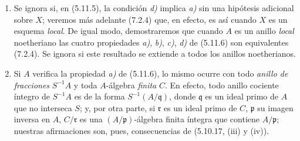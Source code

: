 \begin{remarks}[5.11.7]
\label{IV.2.s5.11.7-fr}
\begin{enumerate}
\item[(i)] Se ignora si, en (5.11.5), la condición \emph{d)} implica \emph{a)} sin una
hipótesis adicional sobre $X$; veremos más adelante (7.2.4) que, en efecto, es
así cuando $X$ es un esquema \emph{local}. De igual modo, demostraremos que
cuando $A$ es un anillo \emph{local} noetheriano las cuatro propiedades \emph{a)}, \emph{b)}, \emph{c)},
\emph{d)} de (5.11.6) son equivalentes (7.2.4). Se ignora si este resultado se extiende a
todos los anillos noetherianos.
\item[(ii)] Si $A$ verifica la propiedad \emph{a)} de (5.11.6), lo mismo ocurre con
todo \emph{anillo de fracciones} $S^{-1}A$ y toda $A$-álgebra \emph{finita} $C$. En efecto,
todo anillo cociente íntegro de $S^{-1}A$ es de la forma
$S^{-1}(A/\mathfrak q)$, donde $\mathfrak q$ es un ideal primo de $A$ que no
interseca $S$; y, por otra parte, si $\mathfrak r$ es un ideal primo de
$C$, $\mathfrak p$ su imagen inversa en $A$, $C/\mathfrak r$ es una
$(A/\mathfrak p)$-álgebra finita íntegra que contiene $A/\mathfrak p$; nuestras
afirmaciones son, pues, consecuencias de (5.10.17, (iii) y (iv)).
\end{enumerate}
\end{remarks}
